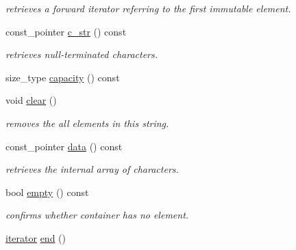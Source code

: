 \begin{DoxyCompactItemize}
\begin{DoxyCompactList}\small\item\em retrieves a forward iterator referring to the first immutable element. \end{DoxyCompactList}\item 
\hypertarget{classhryky_1_1_string_a6cbb3af33227054fa85010603cbfa430}{const\-\_\-pointer \hyperlink{classhryky_1_1_string_a6cbb3af33227054fa85010603cbfa430}{c\-\_\-str} () const }\label{classhryky_1_1_string_a6cbb3af33227054fa85010603cbfa430}

\begin{DoxyCompactList}\small\item\em retrieves null-\/terminated characters. \end{DoxyCompactList}\item 
size\-\_\-type \hyperlink{classhryky_1_1_string_afe570a5245b8ae9fb91ab0aebecc5b5a}{capacity} () const 
\item 
\hypertarget{classhryky_1_1_string_aeb2e094c044bcfc83c814e1610a98e70}{void \hyperlink{classhryky_1_1_string_aeb2e094c044bcfc83c814e1610a98e70}{clear} ()}\label{classhryky_1_1_string_aeb2e094c044bcfc83c814e1610a98e70}

\begin{DoxyCompactList}\small\item\em removes the all elements in this string. \end{DoxyCompactList}\item 
\hypertarget{classhryky_1_1_string_af61f2a74347fabebd76f9fa810341724}{const\-\_\-pointer \hyperlink{classhryky_1_1_string_af61f2a74347fabebd76f9fa810341724}{data} () const }\label{classhryky_1_1_string_af61f2a74347fabebd76f9fa810341724}

\begin{DoxyCompactList}\small\item\em retrieves the internal array of characters. \end{DoxyCompactList}\item 
\hypertarget{classhryky_1_1_string_aff01fafe438f65219695edae5459ed31}{bool \hyperlink{classhryky_1_1_string_aff01fafe438f65219695edae5459ed31}{empty} () const }\label{classhryky_1_1_string_aff01fafe438f65219695edae5459ed31}

\begin{DoxyCompactList}\small\item\em confirms whether container has no element. \end{DoxyCompactList}\item 
\hypertarget{classhryky_1_1_string_a2830c2985a440d5cb2ab58d81d7ec941}{\hyperlink{classhryky_1_1iterator_1_1random_1_1_mutable}{iterator} \hyperlink{classhryky_1_1_string_a2830c2985a440d5cb2ab58d81d7ec941}{end} ()}\label{classhryky_1_1_string_a2830c2985a440d5cb2ab58d81d7ec941}


\end{DoxyCompactItemize}
